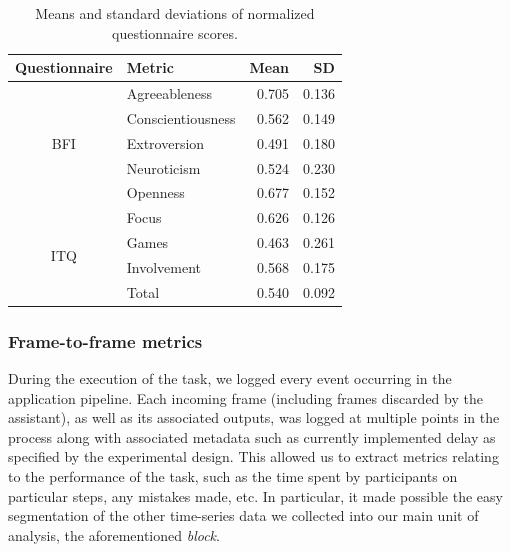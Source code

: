 \documentclass[10pt,letterpaper]{article}
\begin{document}
\begin{table}[h]
  \centering
  \caption{Means and standard deviations of normalized questionnaire scores.}\label{tab:qscores}
  \setlength{\tabcolsep}{0pt} 
  \begin{tabular*}{\columnwidth}{@{\extracolsep{\fill}\quad}clrr@{}}
    \toprule
    \textbf{Questionnaire} & \textbf{Metric} & \textbf{Mean} & \textbf{SD}\\
    \midrule
    \multirow{5}{*}{BFI} 
        & Agreeableness &               0.705 &                  0.136 \\
        & Conscientiousness &               0.562 &                  0.149 \\
        & Extroversion &               0.491 &                  0.180 \\
        & Neuroticism &               0.524 &                  0.230 \\
        & Openness &               0.677 &                  0.152 \\
    \cline{1-4}
    \multirow{4}{*}{ITQ} 
        & Focus &               0.626 &                  0.126 \\
        & Games &               0.463 &                  0.261 \\
        & Involvement &               0.568 &                  0.175 \\
        & Total &               0.540 &                  0.092 \\
    \bottomrule
  \end{tabular*}
\end{table}


\subsubsection{Frame-to-frame metrics}
During the execution of the task, we logged every event occurring in the application pipeline.
Each incoming frame (including frames discarded by the assistant), as well as its associated outputs, was logged at multiple points in the process along with associated metadata such as currently implemented delay as specified by the experimental design.
This allowed us to extract metrics relating to the performance of the task, such as the time spent by participants on particular steps, any mistakes made, etc.
In particular, it made possible the easy segmentation of the other time-series data we collected into our main unit of analysis, the aforementioned \emph{block}.
\end{document}
